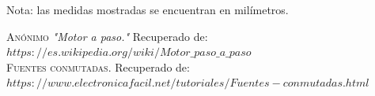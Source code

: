 \documentclass[letterpaper]{article}
\begin{document}
 Nota: las medidas mostradas se encuentran en milímetros.\\
\newpage
    \begin{thebibliography}{x}
         \textsc{Anónimo} \textit{"Motor a paso."} Recuperado de:\\ 
        $https://es.wikipedia.org/wiki/Motor\_paso\_a\_paso$\\
         \textsc{Fuentes conmutadas.} Recuperado de:\\
        $https://www.electronicafacil.net/tutoriales/Fuentes-conmutadas.html$


\end{thebibliography}
\end{document}
